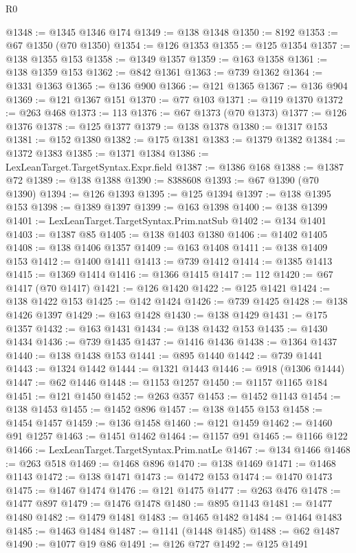 \begin{lexlean}{R0}
\begin{coremodule}
@1348 := @1345 @1346 @174
@1349 := @138 @1348
@1350 := 8192
@1353 := @67 @1350 (@70 @1350)
@1354 := @126 @1353
@1355 := @125 @1354
@1357 := @138 @1355 @153
@1358 := @1349 @1357
@1359 := @163 @1358
@1361 := @138 @1359 @153
@1362 := @842 @1361
@1363 := @739 @1362
@1364 := @1331 @1363
@1365 := @136 @900
@1366 := @121 @1365
@1367 := @136 @904
@1369 := @121 @1367 @151
@1370 := @77 @103
@1371 := @119 @1370
@1372 := @263 @468
@1373 := 113
@1376 := @67 @1373 (@70 @1373)
@1377 := @126 @1376
@1378 := @125 @1377
@1379 := @138 @1378
@1380 := @1317 @153
@1381 := @152 @1380
@1382 := @175 @1381
@1383 := @1379 @1382
@1384 := @1372 @1383
@1385 := @1371 @1384
@1386 := LexLeanTarget.TargetSyntax.Expr.field
@1387 := @1386 @168
@1388 := @1387 @72
@1389 := @138 @1388
@1390 := 8388608
@1393 := @67 @1390 (@70 @1390)
@1394 := @126 @1393
@1395 := @125 @1394
@1397 := @138 @1395 @153
@1398 := @1389 @1397
@1399 := @163 @1398
@1400 := @138 @1399
@1401 := LexLeanTarget.TargetSyntax.Prim.natSub
@1402 := @134 @1401
@1403 := @1387 @85
@1405 := @138 @1403 @1380
@1406 := @1402 @1405
@1408 := @138 @1406 @1357
@1409 := @163 @1408
@1411 := @138 @1409 @153
@1412 := @1400 @1411
@1413 := @739 @1412
@1414 := @1385 @1413
@1415 := @1369 @1414
@1416 := @1366 @1415
@1417 := 112
@1420 := @67 @1417 (@70 @1417)
@1421 := @126 @1420
@1422 := @125 @1421
@1424 := @138 @1422 @153
@1425 := @142 @1424
@1426 := @739 @1425
@1428 := @138 @1426 @1397
@1429 := @163 @1428
@1430 := @138 @1429
@1431 := @175 @1357
@1432 := @163 @1431
@1434 := @138 @1432 @153
@1435 := @1430 @1434
@1436 := @739 @1435
@1437 := @1416 @1436
@1438 := @1364 @1437
@1440 := @138 @1438 @153
@1441 := @895 @1440
@1442 := @739 @1441
@1443 := @1324 @1442
@1444 := @1321 @1443
@1446 := @918 (@1306 @1444)
@1447 := @62 @1446
@1448 := @1153 @1257
@1450 := @1157 @1165 @184
@1451 := @121 @1450
@1452 := @263 @357
@1453 := @1452 @1143
@1454 := @138 @1453
@1455 := @1452 @896
@1457 := @138 @1455 @153
@1458 := @1454 @1457
@1459 := @136 @1458
@1460 := @121 @1459
@1462 := @1460 @91 @1257
@1463 := @1451 @1462
@1464 := @1157 @91
@1465 := @1166 @122
@1466 := LexLeanTarget.TargetSyntax.Prim.natLe
@1467 := @134 @1466
@1468 := @263 @518
@1469 := @1468 @896
@1470 := @138 @1469
@1471 := @1468 @1143
@1472 := @138 @1471
@1473 := @1472 @153
@1474 := @1470 @1473
@1475 := @1467 @1474
@1476 := @121 @1475
@1477 := @263 @476
@1478 := @1477 @897
@1479 := @1476 @1478
@1480 := @895 @1143
@1481 := @1477 @1480
@1482 := @1479 @1481
@1483 := @1465 @1482
@1484 := @1464 @1483
@1485 := @1463 @1484
@1487 := @1141 (@1448 @1485)
@1488 := @62 @1487
@1490 := @1077 @19 @86
@1491 := @126 @727
@1492 := @125 @1491

\end{coremodule}
\end{lexlean}
